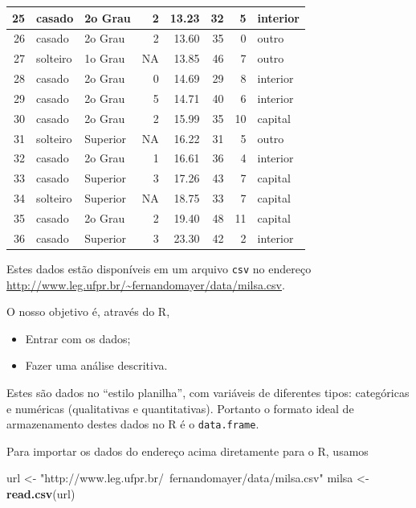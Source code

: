 \documentclass[10pt,a4paper]{book}
\newenvironment{Shaded}{\begin{snugshade}}{\end{snugshade}}
\newcommand{\KeywordTok}[1]{\textcolor[rgb]{0.13,0.29,0.53}{\textbf{#1}}}
\newcommand{\StringTok}[1]{\textcolor[rgb]{0.31,0.60,0.02}{#1}}
\newcommand{\NormalTok}[1]{#1}
\providecommand{\tightlist}{%
  \setlength{\itemsep}{0pt}\setlength{\parskip}{0pt}}
\begin{document}
\begin{tabular}{r|l|l|r|r|r|r|l}
\hline
25 & casado & 2o Grau & 2 & 13.23 & 32 & 5 & interior\\
\hline
26 & casado & 2o Grau & 2 & 13.60 & 35 & 0 & outro\\
\hline
27 & solteiro & 1o Grau & NA & 13.85 & 46 & 7 & outro\\
\hline
28 & casado & 2o Grau & 0 & 14.69 & 29 & 8 & interior\\
\hline
29 & casado & 2o Grau & 5 & 14.71 & 40 & 6 & interior\\
\hline
30 & casado & 2o Grau & 2 & 15.99 & 35 & 10 & capital\\
\hline
31 & solteiro & Superior & NA & 16.22 & 31 & 5 & outro\\
\hline
32 & casado & 2o Grau & 1 & 16.61 & 36 & 4 & interior\\
\hline
33 & casado & Superior & 3 & 17.26 & 43 & 7 & capital\\
\hline
34 & solteiro & Superior & NA & 18.75 & 33 & 7 & capital\\
\hline
35 & casado & 2o Grau & 2 & 19.40 & 48 & 11 & capital\\
\hline
36 & casado & Superior & 3 & 23.30 & 42 & 2 & interior\\
\hline
\end{tabular}

Estes dados estão disponíveis em um arquivo \texttt{csv} no endereço
\url{http://www.leg.ufpr.br/~fernandomayer/data/milsa.csv}.

O nosso objetivo é, através do R,

\begin{itemize}
\tightlist
\item
  Entrar com os dados;
\item
  Fazer uma análise descritiva.
\end{itemize}

Estes são dados no ``estilo planilha'', com variáveis de diferentes
tipos: categóricas e numéricas (qualitativas e quantitativas). Portanto
o formato ideal de armazenamento destes dados no R é o
\texttt{data.frame}.

Para importar os dados do endereço acima diretamente para o R, usamos

\begin{Shaded}
\begin{Highlighting}[]
\NormalTok{url <-}\StringTok{ "http://www.leg.ufpr.br/~fernandomayer/data/milsa.csv"}
\NormalTok{milsa <-}\StringTok{ }\KeywordTok{read.csv}\NormalTok{(url)}
\end{Highlighting}
\end{Shaded}
\end{document}
